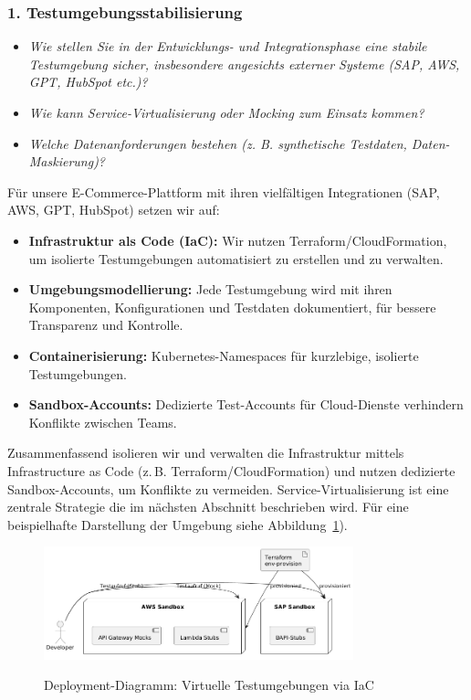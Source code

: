 \subsubsection{1. Testumgebungsstabilisierung}
\begin{itemize}
    \item \textit{Wie stellen Sie in der Entwicklungs- und Integrationsphase eine stabile Testumgebung sicher, insbesondere angesichts externer Systeme (SAP, AWS, GPT, HubSpot etc.)?}
    \item \textit{Wie kann Service-Virtualisierung oder Mocking zum Einsatz kommen?}
    \item \textit{Welche Datenanforderungen bestehen (z. B. synthetische Testdaten, Daten-Maskierung)?}
\end{itemize}
Für unsere E-Commerce-Plattform mit ihren vielfältigen Integrationen (SAP, AWS, GPT, HubSpot) setzen wir auf:
\begin{itemize}
    \item \textbf{Infrastruktur als Code (IaC):} Wir nutzen Terraform/CloudFormation, um isolierte Testumgebungen automatisiert zu erstellen und zu verwalten.
    \item \textbf{Umgebungsmodellierung:} Jede Testumgebung wird mit ihren Komponenten, Konfigurationen und Testdaten dokumentiert, für bessere Transparenz und Kontrolle.
    \item \textbf{Containerisierung:} Kubernetes-Namespaces für kurzlebige, isolierte Testumgebungen.
    \item \textbf{Sandbox-Accounts:} Dedizierte Test-Accounts für Cloud-Dienste verhindern Konflikte zwischen Teams.
\end{itemize}
Zusammenfassend isolieren wir und verwalten die Infrastruktur mittels Infrastructure as Code (z.\,B. Terraform/CloudFormation) und nutzen dedizierte Sandbox-Accounts, um Konflikte zu vermeiden. Service-Virtualisierung ist eine zentrale Strategie die im nächsten Abschnitt beschrieben wird. Für eine beispielhafte Darstellung der Umgebung siehe Abbildung~\ref{fig:deployment}).
\begin{figure}[h!]
\centering
\caption{Deployment-Diagramm: Virtuelle Testumgebungen via IaC}
    \includegraphics[width=0.8\textwidth]{fig/stubing.png}
    \label{fig:deployment}
\end{figure}
